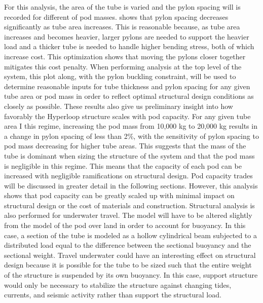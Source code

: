 For this analysis, the area of the tube is varied and the pylon spacing will is
recorded for different of pod masses. 
shows that pylon spacing decreases significantly as tube area increases.
This is reasonable because, as tube area increases and becomes heavier, larger
pylons are needed to support the heavier load and a thicker tube is needed to
handle higher bending stress, both of which increase cost. This optimization
shows that moving the pylons closer together mitigates this cost penalty.
When performing analysis at the top level of the system, this plot along,
with the pylon buckling constraint, will be used to determine reasonable inputs
for tube thickness and pylon spacing for any given tube area or pod mass in
order to reflect optimal structural design conditions as closely as possible.
These results also give us preliminary insight into how favorably the Hyperloop
structure scales with pod capacity. For any given tube area I this regime,
increasing the pod mass from 10,000 kg to 20,000 kg results in a change in
pylon spacing of less than 2\%, with the sensitivity of pylon spacing to pod
mass decreasing for higher tube areas. This suggests that the mass of the tube
is dominant when sizing the structure of the system and that the pod mass is
negligible in this regime. This means that the capacity of each pod can be
increased with negligible ramifications on structural design. Pod capacity
trades will be discussed in greater detail in the following sections. However,
this analysis shows that pod capacity can be greatly scaled up with minimal
impact on structural design or the cost of materials and construction.
Structural analysis is also performed for underwater travel.
The model will have to be altered slightly from the model of the pod over land
in order to account for buoyancy. In this case, a section of the tube is
modeled as a hollow cylindrical beam subjected to a distributed load equal to
the difference between the sectional buoyancy and the sectional weight.
Travel underwater could have an interesting effect on structural design because
it is possible for the tube to be sized such that the entire weight of the
structure is suspended by its own buoyancy. In this case, support structure
would only be necessary to stabilize the structure against changing tides,
currents, and seismic activity rather than support the structural load.

